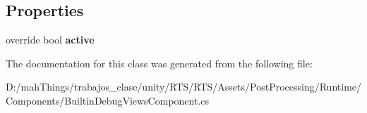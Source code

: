 \subsection*{Properties}
\begin{DoxyCompactItemize}
\item 
\mbox{\label{class_unity_engine_1_1_post_processing_1_1_builtin_debug_views_component_a278b64dc1a7dc3dfae9f829accb1592c}} 
override bool {\bfseries active}
\end{DoxyCompactItemize}


The documentation for this class was generated from the following file\+:\begin{DoxyCompactItemize}
\item 
D\+:/mah\+Things/trabajos\+\_\+clase/unity/\+R\+T\+S/\+R\+T\+S/\+Assets/\+Post\+Processing/\+Runtime/\+Components/Builtin\+Debug\+Views\+Component.\+cs\end{DoxyCompactItemize}
